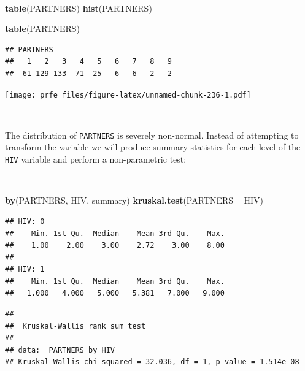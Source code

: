 \documentclass[12pt,a4paper]{book}
\newenvironment{Shaded}{\begin{snugshade}}{\end{snugshade}}
\newcommand{\KeywordTok}[1]{\textcolor[rgb]{0.13,0.29,0.53}{\textbf{#1}}}
\newcommand{\StringTok}[1]{\textcolor[rgb]{0.31,0.60,0.02}{#1}}
\newcommand{\OperatorTok}[1]{\textcolor[rgb]{0.81,0.36,0.00}{\textbf{#1}}}
\newcommand{\NormalTok}[1]{#1}
\theoremstyle{definition}
\theoremstyle{definition}
\theoremstyle{definition}
\theoremstyle{remark}
\begin{document}
~

\begin{Shaded}
\begin{Highlighting}[]
\KeywordTok{table}\NormalTok{(PARTNERS)}
\KeywordTok{hist}\NormalTok{(PARTNERS)}
\end{Highlighting}
\end{Shaded}

\begin{Shaded}
\begin{Highlighting}[]
\KeywordTok{table}\NormalTok{(PARTNERS)}
\end{Highlighting}
\end{Shaded}

\begin{verbatim}
## PARTNERS
##   1   2   3   4   5   6   7   8   9 
##  61 129 133  71  25   6   6   2   2
\end{verbatim}

\newpage

\texttt{[image: prfe\_files/figure-latex/unnamed-chunk-236-1.pdf]}

~

The distribution of \texttt{PARTNERS} is severely non-normal. Instead of
attempting to transform the variable we will produce summary statistics
for each level of the \texttt{HIV} variable and perform a non-parametric
test:

~

\begin{Shaded}
\begin{Highlighting}[]
\KeywordTok{by}\NormalTok{(PARTNERS, HIV, summary)}
\KeywordTok{kruskal.test}\NormalTok{(PARTNERS }\OperatorTok{~}\StringTok{ }\NormalTok{HIV)}
\end{Highlighting}
\end{Shaded}

\begin{verbatim}
## HIV: 0
##    Min. 1st Qu.  Median    Mean 3rd Qu.    Max. 
##    1.00    2.00    3.00    2.72    3.00    8.00 
## -------------------------------------------------------- 
## HIV: 1
##    Min. 1st Qu.  Median    Mean 3rd Qu.    Max. 
##   1.000   4.000   5.000   5.381   7.000   9.000
\end{verbatim}

\begin{verbatim}
## 
##  Kruskal-Wallis rank sum test
## 
## data:  PARTNERS by HIV
## Kruskal-Wallis chi-squared = 32.036, df = 1, p-value = 1.514e-08
\end{verbatim}
\end{document}
